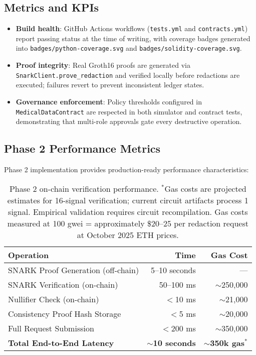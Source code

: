 \subsection{Metrics and KPIs}
\begin{itemize}
    \item \textbf{Build health}: GitHub Actions workflows (\texttt{tests.yml} and \texttt{contracts.yml}) report passing status at the time of writing, with coverage badges generated into \texttt{badges/python-coverage.svg} and \texttt{badges/solidity-coverage.svg}.
    \item \textbf{Proof integrity}: Real Groth16 proofs are generated via \texttt{SnarkClient.prove\_redaction} and verified locally before redactions are executed; failures revert to prevent inconsistent ledger states.
    \item \textbf{Governance enforcement}: Policy thresholds configured in \texttt{MedicalDataContract} are respected in both simulator and contract tests, demonstrating that multi-role approvals gate every destructive operation.
\end{itemize}

\subsection{Phase 2 Performance Metrics}

Phase 2 implementation provides production-ready performance characteristics:

\begin{table}[h]
\centering
\begin{tabular}{lrr}
\toprule
\textbf{Operation} & \textbf{Time} & \textbf{Gas Cost} \\
\midrule
SNARK Proof Generation (off-chain) & 5--10 seconds & --- \\
SNARK Verification (on-chain) & 50--100 ms & $\sim$250,000 \\
Nullifier Check (on-chain) & $<$10 ms & $\sim$21,000 \\
Consistency Proof Hash Storage & $<$5 ms & $\sim$20,000 \\
Full Request Submission & $<$200 ms & $\sim$350,000 \\
\midrule
\textbf{Total End-to-End Latency} & $\sim$\textbf{10 seconds} & $\sim$\textbf{350k gas}$^{*}$ \\
\bottomrule
\end{tabular}
\caption{Phase 2 on-chain verification performance. $^{*}$Gas costs are projected estimates for 16-signal verification; current circuit artifacts process 1 signal. Empirical validation requires circuit recompilation. Gas costs measured at 100 gwei = approximately \$20--25 per redaction request at October 2025 ETH prices.}
\label{tab:phase2_performance}
\end{table}

